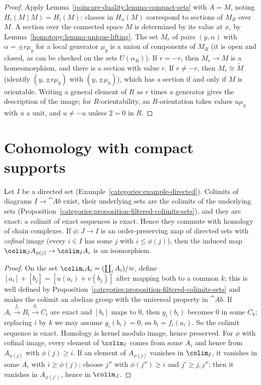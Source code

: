 \begin{proof}
Apply Lemma~\ref{poincare-duality:lemma-compact-sets} with $A = M$, noting $H_i(M \mid M) = H_i(M)$: classes in $H_n(M)$ correspond to sections of $M_R$ over $M$. A section
over the connected space $M$ is determined by its value at $x$, by Lemma~\ref{homotopy:lemma-unique-lifting}. The set $M_r$ of pairs $(y, \alpha)$ with $\alpha = \pm r\mu_y$
for a local generator $\mu_y$ is a union of components of $M_R$ (it is open and closed, as can be checked on the sets $U(\alpha_B)$). If $r = -r$, then $M_r \to M$ is a
homeomorphism, and there is a section with value $r$. If $r \neq -r$, then $M_r \cong \tilde{M}$ (identify $(y, \pm r\mu_y)$ with $(y, \pm\mu_y)$), which has a section if and only
if $M$ is orientable. Writing a general element of $R$ as $r$ times a generator gives the description of the image; for $R$-orientability, an $R$-orientation takes values
$u\mu_y$ with $u$ a unit, and $u \neq -u$ unless $2 = 0$ in $R$.
\end{proof}

\section{Cohomology with compact supports}\label{poincare-duality:section-compact-supports}

\begin{lemma}\label{poincare-duality:lemma-directed-colimits}
Let $I$ be a directed set (Example~\ref{categories:example-directed}). Colimits of diagrams $I \to \cat{Ab}$ exist, their underlying sets are the colimits of the
underlying sets (Proposition~\ref{categories:proposition-filtered-colimits-sets}), and they are exact: a colimit of exact sequences is exact. Hence they commute with
homology of chain complexes. If $\phi \colon J \to I$ is an order-preserving map of directed sets with \emph{cofinal} image (every $i \in I$ has some $j$ with $i \leq \phi(j)$),
then the induced map $\colim_J A_{\phi(j)} \to \colim_I A_i$ is an isomorphism.
\end{lemma}

\begin{proof}
On the set $\colim_i A_i = (\coprod_i A_i)/{\approx}$, define $[a_i] + [b_j] = [u(a_i) + v(b_j)]$ after mapping both to a common $k$; this is well defined by
Proposition~\ref{categories:proposition-filtered-colimits-sets} and makes the colimit an abelian group with the universal property in $\cat{Ab}$. If
$A_i \xrightarrow{f_i} B_i \xrightarrow{g_i} C_i$ are exact and $[b_i]$ maps to $0$, then $g_i(b_i)$ becomes $0$ in some $C_k$; replacing $i$ by $k$ we may assume $g_i(b_i) = 0$,
so $b_i = f_i(a_i)$. So the colimit sequence is exact. Homology is kernel modulo image, hence preserved. For $\phi$ with cofinal image, every element of $\colim_I$ comes from some
$A_i$ and hence from $A_{\phi(j)}$ with $\phi(j) \geq i$. If an element of $A_{\phi(j)}$ vanishes in $\colim_I$, it vanishes in some $A_i$ with $i \geq \phi(j)$; choose $j''$ with
$\phi(j'') \geq i$ and $j' \geq j, j''$; then it vanishes in $A_{\phi(j')}$, hence in $\colim_J$.
\end{proof}

